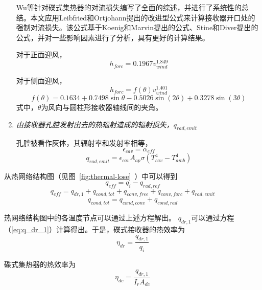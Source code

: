 \begin{enumerate}[label=(\arabic*)]
    Wu等\cite{Wu2010}针对碟式集热器的对流损失编写了全面的综述，并进行了系统性的总结。本文应用Leibfried和Ortjohann\cite{Leibfried1995}提出的改进型公式来计算接收器开口处的强制对流损失。该公式基于Koenig和Marvin\cite{Koenig1981}提出的公式、Stine和Diver\cite{Stine1994}提出的公式，并对一些影响因素进行了分析，具有更好的计算结果。

对于正面迎风，
\begin{equation}
	h_{forc}=0.1967v_{wind}^{1.849}
\end{equation}

对于侧面迎风，
\begin{equation}
	h_{forc}=f(\theta)v_{wind}^{1.401}
\end{equation}
\begin{equation}
	f(\theta)=0.1634 + 0.7498\sin\theta - 0.5026\sin(2\theta) + 0.3278\sin(3\theta)
\end{equation}
式中，$\theta$为风向与圆柱形接收器轴线间的夹角。

  \item \emph{由接收器孔腔发射出去的热辐射造成的辐射损失，$q_{rad,emit}$}
  
  孔腔被看作灰体，其辐射率和发射率相等，
\begin{equation}
    \epsilon_{cav}=\alpha_{eff}
\end{equation}
\begin{equation}
    q_{rad,emit}=\epsilon_{cav}A_{ap}\sigma(T_{cav}^{4}-T_{amb}^{4})
\end{equation}
\end{enumerate}

从热网络结构图（见图~\ref{fig:thermal-lose}~）中可以得到
\begin{equation}
  q_{eff} = q_i - q_{rad,ref}
\end{equation}
\begin{equation}
  q_{eff} = q_{dr,1} + q_{cond,tot} + q_{conv,free} + q_{conv,forc}+q_{rad,emit}
\end{equation}
\begin{equation}
  q_{cond,tot} = q_{cond,conv}+q_{cond,rad}
\end{equation}

热网络结构图中的各温度节点可以通过上述方程解出。
$q_{dr,1}$可以通过方程（\ref{eq:q_dr_1}）计算得出。于是，碟式接收器的热效率为
\begin{equation}
  \eta_{dr} = \frac{q_{dr,1}}{q_i}
\end{equation}

碟式集热器的热效率为
\begin{equation}
  \eta_{dc} = \frac{q_{dr,1}}{I_rA_{dc}}
\end{equation}

